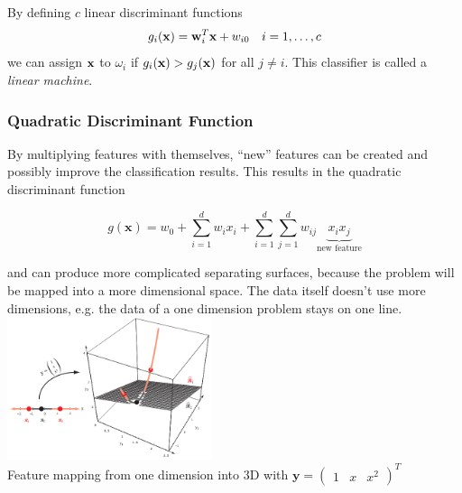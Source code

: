     By defining $c$ linear discriminant functions
    \begin{equation*}
	    g_i(\mathbf{x}) = \mathbf{w}_i^T\mathbf{x} + w_{i0} \quad i=1,\ldots,c
    \end{equation*}
	we can assign $\mathbf{x}$ to $\omega_i$ if $g_i(\mathbf{x}) > g_j(\mathbf{x})$ for all $j \neq i$.
	This classifier is called a \emph{linear machine}.
      
  
  \label{sec:generalized_linear_discriminant_function}
  
  \begin{multicols}{2}
	  \subsubsection{Quadratic Discriminant Function}
	      By multiplying features with themselves, ``new'' features can be created and possibly improve the classification
	      results. This results in the quadratic discriminant function
	      
	      \begin{equation*}
		      g(\bm x) = w_0 + \sum\limits_{i=1}^d w_i x_i + \sum\limits_{i=1}^d \sum\limits_{j=1}^d w_{ij} \underbrace{x_i x_j}_{\text{new feature}}
	      \end{equation*}
	      
	      and can produce more complicated separating surfaces, because the problem will be mapped into a more dimensional space.
	      The data itself doesn't use more dimensions, e.g. the data of a one dimension problem stays on one line. \\
	      
      	 \includegraphics[width=6cm]{./images/map1DTo2D.png} \\
       	 Feature mapping from one dimension into 3D with $\bm{y}=\begin{pmatrix}1&x&x^2\end{pmatrix}^T$ \\
       \columnbreak	 

\end{multicols}
